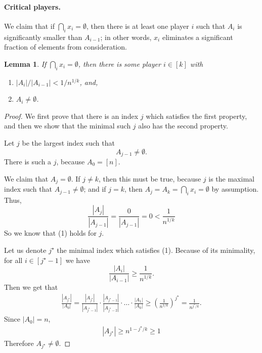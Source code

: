 \documentclass{article}
\theoremstyle{plain}
\newtheorem{lemma}[theorem]{Lemma}
\begin{document}
\paragraph{Critical players.}
We claim that if $\bigcap_i x_i = \emptyset$, then there is at least one player $i$ such that $A_i$ is significantly smaller than $A_{i - 1}$;
in other words, $x_i$ eliminates a significant fraction of elements from consideration.
\begin{lemma}
  If $\bigcap_i x_i = \emptyset$,
  then there is some player $i \in [k]$
  with
  \begin{enumerate}
    \item 
      $|A_{i}| / {|A_{i-1}|} < 1 / n^{1/k}$, and,
    \item $A_i \neq \emptyset$.
  \end{enumerate}
  \label{lemma:narrow}
\end{lemma}
\begin{proof}
  We first prove that there is an index $j$ which satisfies the first property, and then we show
  that the minimal such $j$ also has the second property.

  Let $j$ be the largest index such that 
  \begin{equation*}
    A_{j-1} \neq \emptyset.
  \end{equation*}
  There is such a $j$, because $A_0 = [n]$.

  We claim that $A_{j} = \emptyset$.
  If $j \neq k$, then this must be true, because $j$ is the maximal index such that $A_{j-1} \neq \emptyset$;
  and if $j = k$, then $A_j = A_k = \bigcap_i x_i = \emptyset$ by assumption.
  Thus,
  \begin{equation*}
    \frac{|A_j|}{|A_{j-1}|} = \frac{0}{|A_{j-1}|} = 0 < \frac{1}{n^{1/k}}
  \end{equation*}
  So we know that (1) holds for $j$.
  
  Let us denote $j^\star$ the minimal index which satisfies (1).
  Because of its minimality, for all $i \in [j^\star-1]$ we have
  \begin{equation*}
    \frac{|A_i|}{|A_{i-1}|} \geq \frac{1}{n^{1/k}}.
  \end{equation*}
  Then we get that
  \begin{align*}
    \frac{|A_{j^\star}|}{|A_0|} = 
    \frac{|A_{j^\star}|}{|A_{j^\star-1}|} \cdot \frac{|A_{j^\star-1}|}{|A_{j^\star-2}|} \cdot \ldots \cdot \frac{|A_1|}{|A_0|}
    \geq
    \left(  \frac{1}{n^{1/k}} \right)^{j^\star}
    =
    \frac{1}{n^{j^\star/k}}.
  \end{align*}
  Since $|A_0| = n$, 
  \begin{align*}
      |A_{j^\star}| \geq n^{1 - j^\star/k} \geq 1
  \end{align*}
    Therefore $A_{j^\star} \neq \emptyset$.
\end{proof}
\end{document}
